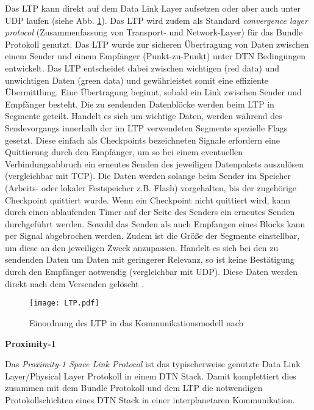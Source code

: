 Das \gls{LTP} kann direkt auf dem Data Link Layer
aufsetzen oder aber auch unter \gls{UDP} laufen (siehe Abb. \ref{fig:LTP}). Das \gls{LTP}
wird zudem als Standard \textit{convergence layer protocol} (Zusammenfassung von
Transport- und Network-Layer) f{\"u}r das Bundle Protokoll genutzt. Das \gls{LTP}
wurde zur sicheren {\"U}bertragung von Daten zwischen einem Sender und einem
Empf{\"a}nger (Punkt-zu-Punkt) unter \gls{DTN} Bedingungen entwickelt. Das \gls{LTP}
entscheidet dabei zwischen wichtigen (red data) und unwichtigen Daten (green
data) und gew{\"a}hrleistet somit eine effiziente {\"U}bermittlung. Eine
{\"U}bertragung beginnt, sobald ein Link zwischen Sender und Empf{\"a}nger
besteht. Die zu sendenden Datenbl{\"o}cke werden beim \gls{LTP} in Segmente geteilt.
Handelt es sich um wichtige Daten, werden w{\"a}hrend des Sendevorgangs
innerhalb der im \gls{LTP} verwendeten Segmente spezielle Flags gesetzt.
Diese einfach als Checkpoints bezeichneten Signale erfordern eine Quittierung
durch den Empf{\"a}nger, um so bei einem eventuellen Verbindungsabbruch ein
erneutes Senden des jeweiligen Datenpakets auszul{\"o}sen (vergleichbar mit
TCP). Die Daten werden solange beim Sender im Speicher (Arbeits- oder lokaler
Festspeicher z.B. Flash) vorgehalten, bis der zugeh{\"o}rige Checkpoint
quittiert wurde. Wenn ein Checkpoint nicht quittiert wird, kann durch einen
ablaufenden Timer auf der Seite des Senders ein erneutes Senden durchgeführt
werden. Sowohl das Senden als auch Empfangen eines Blocks kann per Signal
abgebrochen werden. Zudem ist die Gr{\"o}{\ss}e der Segmente einstellbar, um
diese an den jeweiligen Zweck anzupassen. Handelt es sich bei den zu sendenden
Daten um Daten mit geringerer Relevanz, so ist keine Best{\"a}tigung durch den
Empf{\"a}nger notwendig (vergleichbar mit UDP).
Diese Daten werden direkt nach dem Versenden gel{\"o}scht \cite{web4}.

\begin{figure}[H]
\centering
\texttt{[image: LTP.pdf]}
\caption{Einordnung des LTP in das Kommunikationsmodell nach \cite{Burleigh}}
\label{fig:LTP}
\end{figure}

\textbf{Proximity-1}

Das \textit{Proximity-1 Space Link Protocol} ist das typischerweise genutzte
Data Link Layer/Physical Layer Protokoll in einem \gls{DTN} Stack. Damit komplettiert
dies zusammen mit dem Bundle Protokoll und dem \gls{LTP} die notwendigen
Protokollschichten eines \gls{DTN} Stack in einer interplanetaren Kommunikation.

